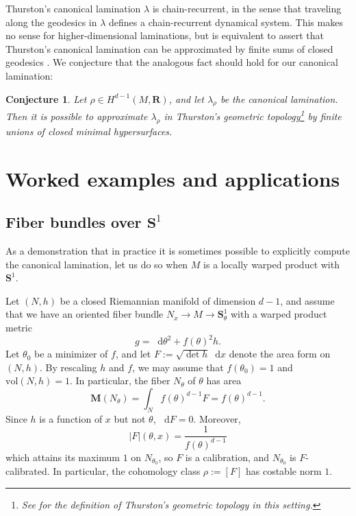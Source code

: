 \documentclass[reqno,11pt]{amsart}
\newcommand{\RR}{\mathbf{R}}
\newcommand{\Sph}{\mathbf S}
\newcommand*\dif{\mathop{}\!\mathrm{d}}
\newcommand{\vol}{\mathrm{vol}}
\newcommand{\Mass}{\mathbf M}
\newtheorem{conjecture}[theorem]{Conjecture}
\theoremstyle{definition}
\numberwithin{equation}{section}
\begin{document}
Thurston's canonical lamination $\lambda$ is chain-recurrent, in the sense that traveling along the geodesics in $\lambda$ defines a chain-recurrent dynamical system.
This makes no sense for higher-dimensional laminations, but is equivalent to assert that Thurston's canonical lamination can be approximated by finite sums of closed geodesics \cite[\S9]{Gu_ritaud_2017}.
We conjecture that the analogous fact should hold for our canonical lamination:

\begin{conjecture}\label{chain recurrence}
Let $\rho \in H^{d - 1}(M, \RR)$, and let $\lambda_\rho$ be the canonical lamination.
Then it is possible to approximate $\lambda_\rho$ in Thurston's geometric topology\footnote{See \cite[\S1]{BackusCML} for the definition of Thurston's geometric topology in this setting.} by finite unions of closed minimal hypersurfaces.
\end{conjecture}

\section{Worked examples and applications}
\subsection{Fiber bundles over \texorpdfstring{$\Sph^1$}{the circle}}
As a demonstration that in practice it is sometimes possible to explicitly compute the canonical lamination, let us do so when $M$ is a locally warped product with $\Sph^1$.

Let $(N, h)$ be a closed Riemannian manifold of dimension $d - 1$, and assume that we have an oriented fiber bundle $N_x \to M \to \Sph^1_\theta$ with a warped product metric 
$$g = \dif \theta^2 + f(\theta)^2 h.$$
Let $\theta_0$ be a minimizer of $f$, and let $F := \sqrt{\det h} \dif x$ denote the area form on $(N, h)$.
By rescaling $h$ and $f$, we may assume that $f(\theta_0) = 1$ and $\vol(N, h) = 1$.
In particular, the fiber $N_\theta$ of $\theta$ has area
$$\Mass(N_\theta) = \int_N f(\theta)^{d - 1} F = f(\theta)^{d - 1}.$$
Since $h$ is a function of $x$ but not $\theta$, $\dif F = 0$.
Moreover,
\begin{equation}\label{fiber bundle sample comass}
|F|(\theta, x) = \frac{1}{f(\theta)^{d - 1}}
\end{equation}
which attains its maximum $1$ on $N_{\theta_0}$, so $F$ is a calibration, and $N_{\theta_0}$ is $F$-calibrated.
In particular, the cohomology class $\rho := [F]$ has costable norm $1$.
\end{document}
